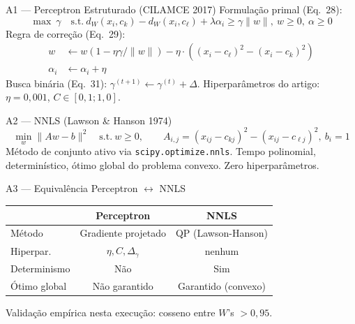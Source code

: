 \documentclass[aspectratio=169,10pt]{beamer}
\begin{document}

\begin{frame}{A1 --- Perceptron Estruturado (CILAMCE 2017)}
  \scriptsize
  Formula\c{c}\~ao primal (Eq.\ 28):
  \[ \max\ \gamma \quad \text{s.t.}\ d_W(x_i,c_k) - d_W(x_i,c_\ell) + \lambda\alpha_i \geq \gamma\|w\|,\ w \geq 0,\ \alpha \geq 0 \]
  Regra de corre\c{c}\~ao (Eq.\ 29):
  \begin{align*}
    w &\leftarrow w(1 - \eta\gamma/\|w\|) - \eta \cdot ((x_i-c_\ell)^2 - (x_i-c_k)^2) \\
    \alpha_i &\leftarrow \alpha_i + \eta
  \end{align*}
  Busca bin\'aria (Eq.\ 31): $\gamma^{(t+1)} \leftarrow \gamma^{(t)} + \Delta$. Hiperpar\^ametros do artigo: $\eta=0{,}001$, $C \in [0{,}1; 1{,}0]$.
\end{frame}

\begin{frame}{A2 --- NNLS (Lawson \& Hanson 1974)}
  \scriptsize
  \[ \min_w \|Aw - b\|^2 \quad \text{s.t.}\ w \geq 0, \qquad A_{i,j} = (x_{ij} - c_{kj})^2 - (x_{ij} - c_{\ell j})^2,\ b_i = 1 \]
  M\'etodo de conjunto ativo via \texttt{scipy.optimize.nnls}. Tempo polinomial, determin\'istico, \'otimo global do problema convexo. Zero hiperpar\^ametros.
\end{frame}

\begin{frame}{A3 --- Equival\^encia Perceptron $\leftrightarrow$ NNLS}
  \scriptsize
  \begin{center}
  \begin{tabular}{lcc}
    \toprule
    & Perceptron & NNLS \\
    \midrule
    M\'etodo  & Gradiente projetado & QP (Lawson-Hanson) \\
    Hiperpar.\ & $\eta, C, \Delta_\gamma$ & nenhum \\
    Determinismo & N\~ao & Sim \\
    \'Otimo global & N\~ao garantido & Garantido (convexo) \\
    \bottomrule
  \end{tabular}
  \end{center}
  Valida\c{c}\~ao emp\'irica nesta execu\c{c}\~ao: cosseno entre $W$'s $> 0{,}95$.
\end{frame}
\end{document}
